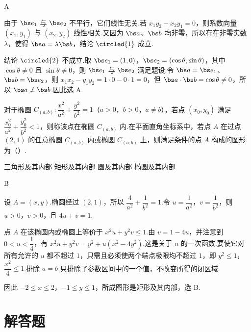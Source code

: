 \begin{answer}
A
\end{answer}

\begin{solution}
由于 \(\bs e_1\) 与 \(\bs e_2\) 不平行，它们线性无关.若 \(x_1y_2-x_2y_1=0\)，则系数向量 \((x_1,y_1)\) 与 \((x_2,y_2)\) 线性相关.又因为 \(\bs a\)、\(\bs b\) 均非零，所以存在非零实数 \(\lambda\)，使得 \(\bs a=\lambda\bs b\)，结论 \(\circled{1}\) 成立.

结论 \(\circled{2}\) 不成立.取 \(\bs e_1=(1,0)\)，\(\bs e_2=(\cos\theta,\sin\theta)\)，其中 \(\cos\theta\neq0\) 且 \(\sin\theta\neq0\)，则 \(\bs e_1\) 与 \(\bs e_2\) 满足题设.令 \(\bs a=\bs e_1\)、\(\bs b=\bs e_2\)，则 \(x_1x_2-y_1y_2=1\cdot0-0\cdot1=0\)，但 \(\bs a\cdot\bs b=\cos\theta\neq0\)，所以 \(\bs a\not\perp\bs b\).因此选 A.
\end{solution}

\begin{problem}
对于椭圆 \(C_{(a,b)}:\dfrac{x^2}{a^2}+\dfrac{y^2}{b^2}=1\)（\(a>0\)，\(b>0\)，\(a\neq b\)），若点 \((x_0,y_0)\) 满足 \(\dfrac{x_0^2}{a^2}+\dfrac{y_0^2}{b^2}<1\)，则称该点在椭圆 \(C_{(a,b)}\) 内.在平面直角坐标系中，若点 \(A\) 在过点 \((2,1)\) 的任意椭圆 \(C_{(a,b)}\) 内或椭圆 \(C_{(a,b)}\) 上，则满足条件的点 \(A\) 构成的图形为（\quad）.

\choices
    {三角形及其内部}
    {矩形及其内部}
    {圆及其内部}
    {椭圆及其内部}
\end{problem}

\begin{answer}
B
\end{answer}

\begin{solution}
设 \(A=(x,y)\).椭圆经过 \((2,1)\)，所以
\(\dfrac4{a^2}+\dfrac1{b^2}=1\).令 \(u=\dfrac1{a^2}\)，\(v=\dfrac1{b^2}\)，则 \(u>0\)，\(v>0\)，且 \(4u+v=1\).

点 \(A\) 在该椭圆内或椭圆上等价于 \(x^2u+y^2v\leq1\).由 \(v=1-4u\)，并注意到 \(0<u<\dfrac14\)，有
\(x^2u+y^2v=y^2+u(x^2-4y^2)\).这是关于 \(u\) 的一次函数.要使它对所有允许的 \(u\) 都不超过 \(1\)，只需且必须使两个端点极限均不超过 \(1\)，即
\(y^2\leq1\)，\(\dfrac{x^2}{4}\leq1\).排除 \(a=b\) 只排除了参数区间中的一个值，不改变所得的闭区域.

因此 \(-2\leq x\leq2\)，\(-1\leq y\leq1\)，所成图形是矩形及其内部，选 B.
\end{solution}

\section{解答题}

